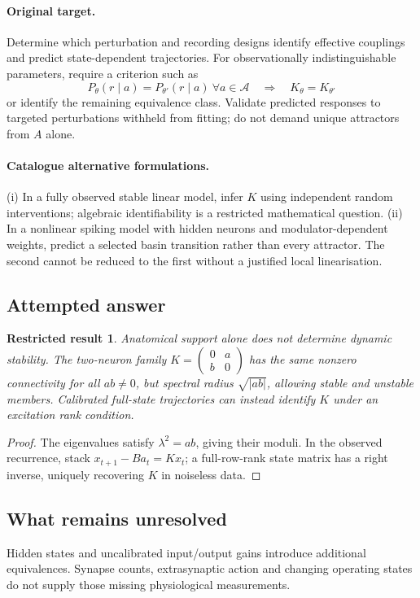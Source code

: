 \documentclass[11pt]{article}
\newtheorem{attemptresult}{Restricted result}[section]
\begin{document}
\paragraph{Original target.}
Determine which perturbation and recording designs identify effective couplings and predict state-dependent trajectories. For observationally indistinguishable parameters, require a criterion such as
\[
P_\theta(r\mid a)=P_{\theta'}(r\mid a)\ \forall a\in\mathcal A
\quad\Longrightarrow\quad
K_\theta=K_{\theta'}
\]
or identify the remaining equivalence class. Validate predicted responses to targeted perturbations withheld from fitting; do not demand unique attractors from $A$ alone.
\paragraph{Catalogue alternative formulations.}
(i) In a fully observed stable linear model, infer $K$ using independent random interventions; algebraic identifiability is a restricted mathematical question. (ii) In a nonlinear spiking model with hidden neurons and modulator-dependent weights, predict a selected basin transition rather than every attractor. The second cannot be reduced to the first without a justified local linearisation.
\subsection{Attempted answer}
\begin{attemptresult}
Anatomical support alone does not determine dynamic stability. The two-neuron family $K=\left(\begin{smallmatrix}0&a\\b&0\end{smallmatrix}\right)$ has the same nonzero connectivity for all $ab\ne0$, but spectral radius $\sqrt{|ab|}$, allowing stable and unstable members. Calibrated full-state trajectories can instead identify $K$ under an excitation rank condition.
\end{attemptresult}
\begin{proof}
The eigenvalues satisfy $\lambda^2=ab$, giving their moduli. In the observed recurrence, stack $x_{t+1}-Ba_t=Kx_t$; a full-row-rank state matrix has a right inverse, uniquely recovering $K$ in noiseless data.
\end{proof}
\subsection{What remains unresolved}
Hidden states and uncalibrated input/output gains introduce additional equivalences. Synapse counts, extrasynaptic action and changing operating states do not supply those missing physiological measurements.
\end{document}

